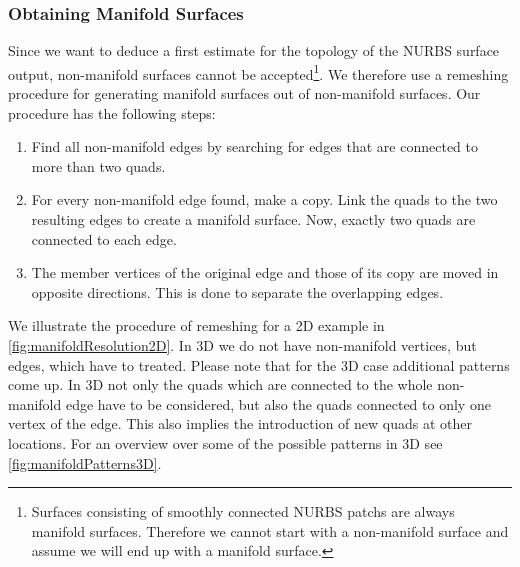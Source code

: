 \subsubsection{Obtaining Manifold Surfaces}
Since we want to deduce a first estimate for the topology of the \ac{NURBS} surface output, non-manifold surfaces cannot be accepted\footnote{Surfaces consisting of smoothly connected \ac{NURBS} \acp{patch} are always manifold surfaces. Therefore we cannot start with a non-manifold surface and assume we will end up with a manifold surface.}. We therefore use a remeshing procedure for generating manifold surfaces out of non-manifold surfaces. Our procedure has the following steps:
\begin{enumerate}
\item Find all non-manifold edges by searching for edges that are connected to more than two \acp{quad}.
\item For every non-manifold edge found, make a copy. Link the quads to the two resulting edges to create a manifold surface. Now, exactly two \acp{quad} are connected to each edge.
\item The member vertices of the original edge and those of its copy are moved in opposite directions. This is done to separate the overlapping edges. 
\end{enumerate}
We illustrate the procedure of remeshing for a 2D example in \autoref{fig:manifoldResolution2D}. 
In 3D we do not have non-manifold vertices, but edges, which have to treated. Please note that for the 3D case additional patterns come up. In 3D not only the \acp{quad} which are connected to the whole non-manifold edge have to be considered, but also the \acp{quad} connected to only one vertex of the edge. This also implies the introduction of new \acp{quad} at other locations. For an overview over some of the possible patterns in 3D see \autoref{fig:manifoldPatterns3D}.
